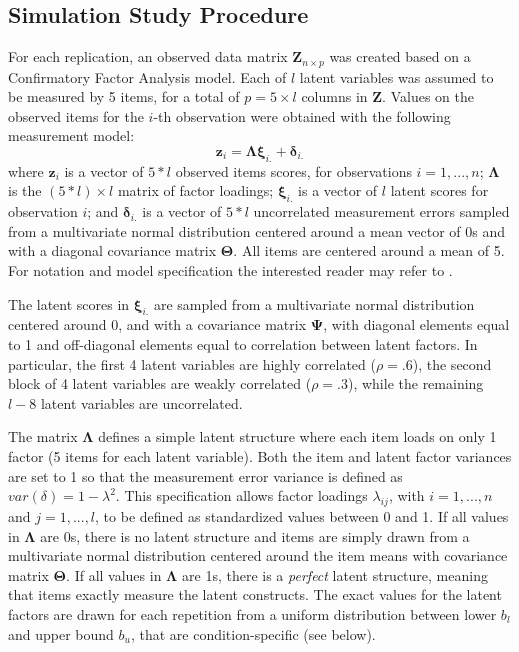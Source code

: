 \FloatBarrier %

\subsection{Simulation Study Procedure}

	For each replication, an observed data matrix $\bm{Z}_{n \times p}$ was created based on a Confirmatory 
	Factor Analysis model.
	Each of $l$ latent variables was assumed to be measured by 5 items, for a total of $p = 5 \times l$ 
	columns in $\bm{Z}$.
	Values on the observed items for the $i$-th observation were obtained with the following measurement 
	model:
%
	\begin{equation}
		\bm{z}_i = \bm{\Lambda} \bm{\xi}_{i.} + \bm{\delta}_{i.}
	\end{equation}
%
	where $\bm{z}_i$ is a vector of $5*l$ observed items scores, for observations $i = 1, ..., n$;
	$\bm{\Lambda}$ is the $(5*l) \times l$ matrix of factor loadings; $\bm{\xi}_{i.}$ is a vector of $l$ latent scores 
	for observation $i$; and $\bm{\delta}_{i.}$ is a vector of $5*l$ uncorrelated measurement errors sampled from a 
	multivariate normal distribution centered around a mean vector of 0s and with a diagonal covariance matrix $\bm{\Theta}$.
	All items are centered around a mean of 5.
	For notation and model specification the interested reader may refer to \cite{bollen:1989}.

	The latent scores in $\bm{\xi}_{i.}$ are sampled from a multivariate normal distribution centered around 
	0, and with a covariance matrix $\bm{\Psi}$, with diagonal elements equal to 1 and off-diagonal elements 
	equal to correlation between latent factors. 
	In particular, the first 4 latent variables are highly correlated ($\rho = .6$), the second block of 4 
	latent variables are weakly correlated ($\rho = .3$), while the remaining $l-8$ latent variables are 
	uncorrelated.

	The matrix $\bm{\Lambda}$ defines a simple latent structure where each item loads on only 1 factor (5 items 
	for each latent variable).
	Both the item and latent factor variances are set to 1 so that the measurement error variance is defined as 
	$var(\delta) = 1 - \lambda^{2}$.
	This specification allows factor loadings $\lambda_{ij}$, with $i = 1, ..., n$ and $j = 1, ..., l$, to be
	defined as standardized values between 0 and 1.
	If all values in $\bm{\Lambda}$ are 0s, there is no latent structure and items are simply drawn from a
	multivariate normal distribution centered around the item means with covariance matrix $\bm{\Theta}$.
	If all values in $\bm{\Lambda}$ are 1s, there is a \emph{perfect} latent structure, meaning that items
	exactly measure the latent constructs.
	The exact values for the latent factors are drawn for each repetition from a uniform distribution between
	lower $b_l$ and upper bound $b_u$, that are condition-specific (see below).

